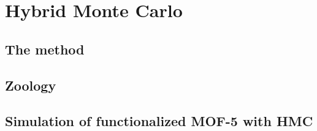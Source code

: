 \documentclass[thesis]{subfiles}
\begin{document}
\chapter{Hybrid Monte Carlo}

\section{The method}

\section{Zoology}

\section{Simulation of functionalized MOF-5 with HMC}
\end{document}
